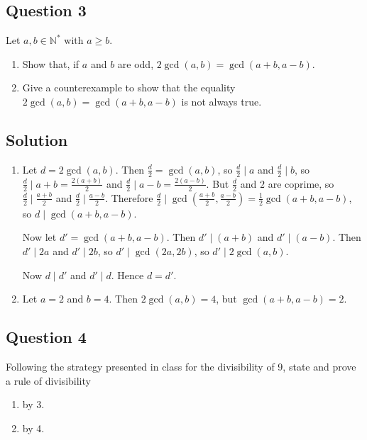 \documentclass{article}
\begin{document}
\subsection*{Question 3}
    Let $a, b \in \mathbb{N}^{*}$ with $a \ge b$.
    \begin{enumerate}
        \item Show that, if $a$ and $b$ are odd, $2\gcd(a, b) = \gcd(a + b, a - b)$.
        \item Give a counterexample to show that the equality $2\gcd(a, b) = \gcd(a + b, a - b)$ is not always true.
    \end{enumerate}

\subsection*{Solution}
    \begin{enumerate}
        \item 
        
        Let $d = 2\gcd(a, b)$. Then $\frac{d}{2} = \gcd(a, b)$, so $\frac{d}{2} \mid a$ and $\frac{d}{2} \mid b$, so $\frac{d}{2} \mid a + b = \frac{2(a + b)}{2}$ and $\frac{d}{2} \mid a - b = \frac{2(a - b)}{2}$. But $\frac{d}{2}$ and $2$ are coprime, so $\frac{d}{2} \mid \frac{a + b}{2}$ and $\frac{d}{2} \mid \frac{a - b}{2}$. Therefore $\frac{d}{2} \mid \gcd\left(\frac{a + b}{2}, \frac{a - b}{2}\right) = \frac{1}{2}\gcd(a + b, a - b)$, so $d \mid \gcd(a + b, a - b)$.
        
        \vspace{1.5mm}
        Now let $d' = \gcd(a + b, a - b)$. Then $d' \mid (a + b)$ and $d' \mid (a - b)$. Then $d' \mid 2a$ and $d' \mid 2b$, so $d' \mid \gcd(2a, 2b)$, so $d' \mid 2\gcd(a, b)$.
        
        \vspace{1.5mm}
        Now $d \mid d'$ and $d' \mid d$. Hence $d = d'$.
        \item Let $a = 2$ and $b = 4$. Then $2\gcd(a, b) = 4$, but $\gcd(a + b, a - b) = 2$.
    \end{enumerate}

\subsection*{Question 4}
    Following the strategy presented in class for the divisibility of 9, state and prove a rule of divisibility
    \begin{enumerate}
        \item by 3.
        \item by 4.
    \end{enumerate}
\end{document}
